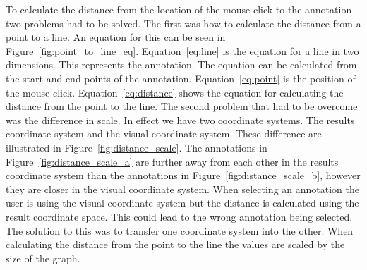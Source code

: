 To calculate the distance from the location of the mouse click to the annotation two problems had to be solved.  The first was how to calculate the distance from a point to a line.  An equation for this can be seen in Figure~\ref{fig:point_to_line_eq}.  Equation~\ref{eq:line} is the equation for a line in two dimensions.  This represents the annotation.  The equation can be calculated from the start and end points of the annotation. Equation~\ref{eq:point} is the position of the mouse click.  Equation~\ref{eq:distance} shows the equation for calculating the distance from the point to the line.  The second problem that had to be overcome was the difference in scale.  In effect we have two coordinate systems.  The results coordinate system and the visual coordinate system.  These difference are illustrated in Figure~\ref{fig:distance_scale}.  The annotations in Figure~\ref{fig:distance_scale_a} are further away from each other in the results coordinate system than the annotations in Figure~\ref{fig:distance_scale_b}, however they are closer in the visual coordinate system.  When selecting an annotation the user is using the visual coordinate system but the distance is calculated using the result coordinate space.  This could lead to the wrong annotation being selected.  The solution to this was to transfer one coordinate system into the other.  When calculating the distance from the point to the line the values are scaled by the size of the graph.

